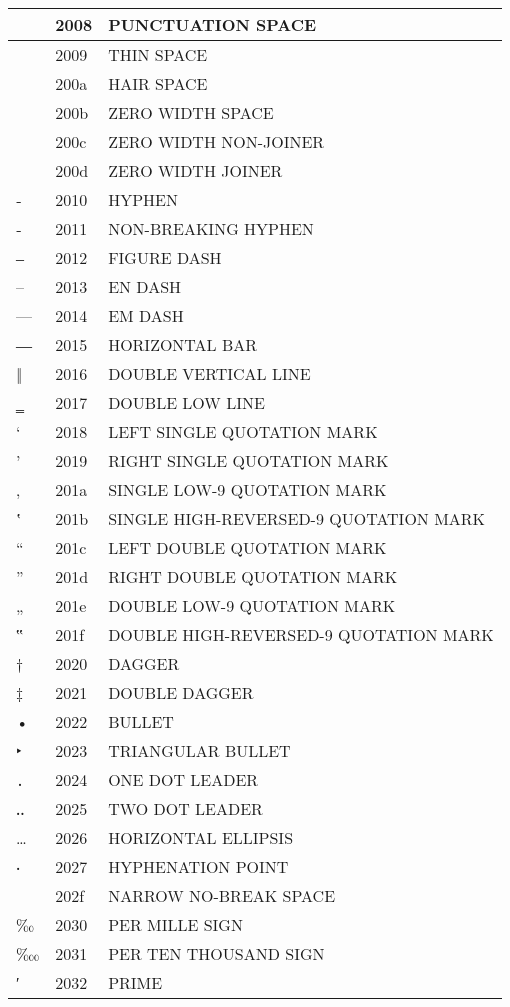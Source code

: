 \documentclass[12pt,letterpaper,openany]{book}
\begin{document}
\begin{center}
\begin{supertabular}{|m{0.25in}|m{0.5in}|m{4in}|}
  & 2008 & PUNCTUATION SPACE\\\hline
  & 2009 & THIN SPACE\\\hline
  & 200a & HAIR SPACE\\\hline
​ & 200b & ZERO WIDTH SPACE\\\hline
‌ & 200c & ZERO WIDTH NON-JOINER\\\hline
‍ & 200d & ZERO WIDTH JOINER\\\hline
‐ & 2010 & HYPHEN\\\hline
‑ & 2011 & NON-BREAKING HYPHEN\\\hline
‒ & 2012 & FIGURE DASH\\\hline
– & 2013 & EN DASH\\\hline
— & 2014 & EM DASH\\\hline
― & 2015 & HORIZONTAL BAR\\\hline
‖ & 2016 & DOUBLE VERTICAL LINE\\\hline
‗ & 2017 & DOUBLE LOW LINE\\\hline
‘ & 2018 & LEFT SINGLE QUOTATION MARK\\\hline
’ & 2019 & RIGHT SINGLE QUOTATION MARK\\\hline
‚ & 201a & SINGLE LOW-9 QUOTATION MARK\\\hline
‛ & 201b & SINGLE HIGH-REVERSED-9 QUOTATION MARK\\\hline
“ & 201c & LEFT DOUBLE QUOTATION MARK\\\hline
” & 201d & RIGHT DOUBLE QUOTATION MARK\\\hline
„ & 201e & DOUBLE LOW-9 QUOTATION MARK\\\hline
‟ & 201f & DOUBLE HIGH-REVERSED-9 QUOTATION MARK\\\hline
† & 2020 & DAGGER\\\hline
‡ & 2021 & DOUBLE DAGGER\\\hline
• & 2022 & BULLET\\\hline
‣ & 2023 & TRIANGULAR BULLET\\\hline
․ & 2024 & ONE DOT LEADER\\\hline
‥ & 2025 & TWO DOT LEADER\\\hline
… & 2026 & HORIZONTAL ELLIPSIS\\\hline
‧ & 2027 & HYPHENATION POINT\\\hline
  & 202f & NARROW NO-BREAK SPACE\\\hline
‰ & 2030 & PER MILLE SIGN\\\hline
‱ & 2031 & PER TEN THOUSAND SIGN\\\hline
′ & 2032 & PRIME\\\hline

\end{supertabular}
\end{center}
\end{document}
